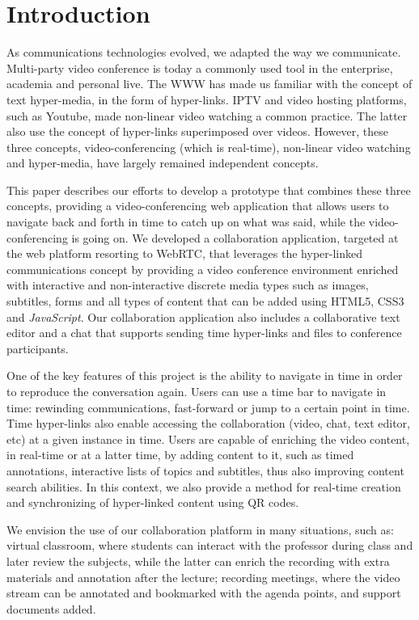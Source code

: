 \documentclass[10pt,conference]{IEEEtran}
\begin{document}
\section{Introduction}
\label{chapter:introduction}


As communications technologies evolved, we adapted the way we communicate. 
Multi-party video conference is today a commonly used tool in the enterprise, academia and personal live.
The \gls{WWW} has made us familiar with the concept of text hyper-media, in the form of hyper-links.
\gls{IPTV} and video hosting platforms, such as Youtube, made non-linear video watching a common practice.
The latter also use the concept of hyper-links superimposed over videos.
However, these three concepts, video-conferencing (which is real-time), non-linear video watching and hyper-media, have largely remained independent concepts.

This paper describes our efforts to develop a prototype that combines these three concepts, providing a video-conferencing web application that allows users to navigate back and forth in time to catch up on what was said, while the video-conferencing is going on.
We developed a collaboration application, targeted at the web platform resorting to \gls{WebRTC}, that leverages the hyper-linked communications concept by providing a video conference environment enriched with interactive and non-interactive discrete media types such as images, subtitles, forms and all types of content that can be added using \gls{HTML}5, \gls{CSS}3 and \emph{JavaScript}.
Our collaboration application also includes a collaborative text editor and a chat that supports sending time hyper-links and files to conference participants.

One of the key features of this project is the ability to navigate in time in order to reproduce the conversation again.
Users can use a time bar to navigate in time: rewinding communications, fast-forward or jump to a certain point in time.
Time hyper-links also enable accessing the collaboration (video, chat, text editor, etc) at a given instance in time.
Users are capable of enriching the video content, in real-time or at a latter time, by adding content to it, such as timed annotations, interactive lists of topics and subtitles, thus also improving content search abilities.
In this context, we also provide a method for real-time creation and synchronizing of hyper-linked content using \gls{QR} codes.

We envision the use of our collaboration platform in many situations, such as: virtual classroom, where students can interact with the professor during class and later review the subjects, while the latter can enrich the recording with extra materials and annotation after the lecture; recording meetings, where the video stream can be annotated and bookmarked with the agenda points, and support documents added.
\end{document}
